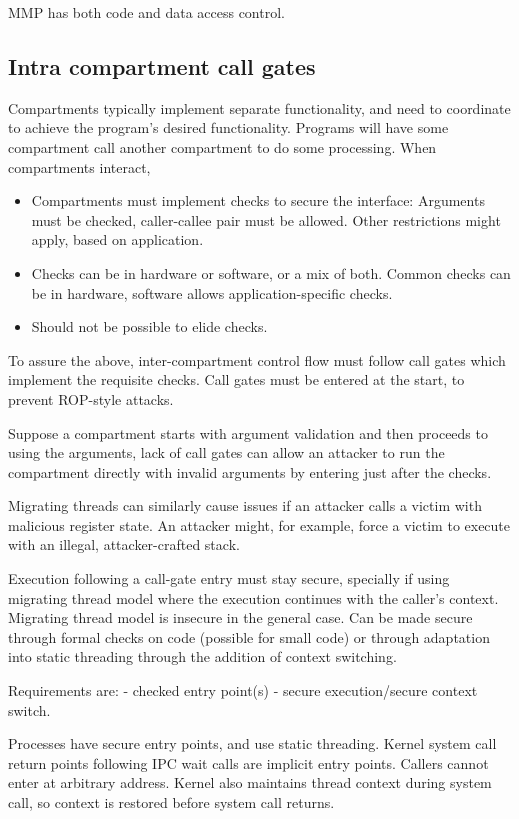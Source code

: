 MMP has both code and data access control.

\subsection{Intra compartment call gates}

Compartments typically implement separate functionality, and
need to coordinate to achieve the program's desired functionality.
Programs will have some compartment call another compartment to
do some processing.
When compartments interact, 
\begin{itemize}
      \item Compartments must implement checks to secure the interface:
            Arguments must be checked, caller-callee pair must be
            allowed.
            Other restrictions might apply, based on application.
      \item Checks can be in hardware or software, or a mix of both.
            Common checks can be in hardware, software allows 
            application-specific checks.
      \item Should not be possible to elide checks.
\end{itemize}
To assure the above, inter-compartment control flow must follow call gates
which implement the requisite checks.
Call gates must be entered at the start, to prevent ROP-style attacks.

Suppose a compartment starts with argument validation and then proceeds to
using the arguments, lack of call gates can allow an attacker to run the 
compartment directly with invalid arguments by entering just after the
checks.

Migrating threads can similarly cause issues if an attacker calls a victim
with malicious register state.
An attacker might, for example, force a victim to execute with an illegal,
attacker-crafted stack.

Execution following a call-gate entry must stay secure, specially if using
migrating thread model where the execution continues with the caller's 
context.
Migrating thread model is insecure in the general case. 
Can be made secure through formal checks on code (possible for small code)
or through adaptation into static threading through the addition of context
switching.

Requirements are:
- checked entry point(s)
- secure execution/secure context switch.

Processes have secure entry points, and use static threading.
Kernel system call return points following IPC wait calls are implicit
entry points. 
Callers cannot enter at arbitrary address.
Kernel also maintains thread context during system call, so context is
restored before system call returns.

